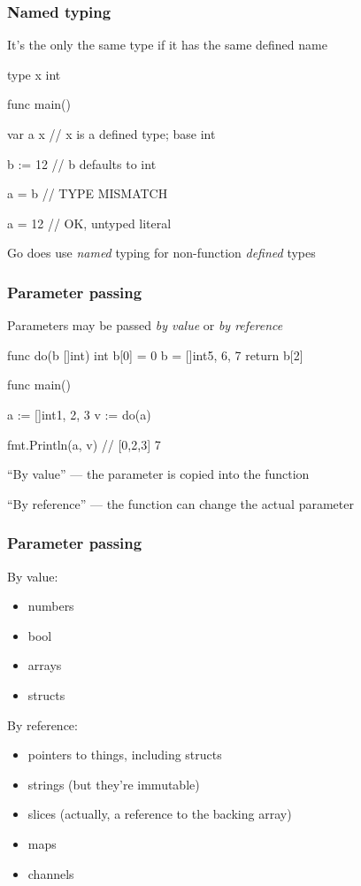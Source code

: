 \documentclass[handout,compress,t,11pt]{beamer}
\begin{document}
\begin{frame}[fragile]
    \frametitle{Named typing}
    It's the only the same type if it has the same defined name
\begin{golang}
type x int

func main() {
	var a x      // x is a defined type; base int

	b := 12      // b defaults to int

	a = b        // TYPE MISMATCH

    a = 12       // OK, untyped literal
}
\end{golang}
    \vspace{\baselineskip}
Go does use {\em named} typing for non-function {\em defined} types
\end{frame}

\begin{frame}[fragile]
    \frametitle{Parameter passing}
    Parameters may be passed {\em by value} or {\em by reference}
\begin{golang}
func do(b []int) int {
	b[0] = 0
	b = []int{5, 6, 7}
	return b[2]
}

func main() {
	a := []int{1, 2, 3}
	v := do(a)

	fmt.Println(a, v)    // [0,2,3] 7
}
\end{golang}
\vspace{0.4\baselineskip}
``By value'' --- the parameter is copied into the function \par
\vspace{0.4\baselineskip}
``By reference'' --- the function can change the actual parameter
\end{frame}

\begin{frame}[fragile]
    \frametitle{Parameter passing}
    By value:
    \begin{itemize}
        \item numbers
        \item bool
        \item arrays
        \item structs
    \end{itemize}

    By reference:
    \begin{itemize}
        \item pointers to things, including structs
        \item strings (but they're immutable)
        \item slices (actually, a reference to the backing array)
        \item maps
        \item channels
    \end{itemize}
\end{frame}
\end{document}
